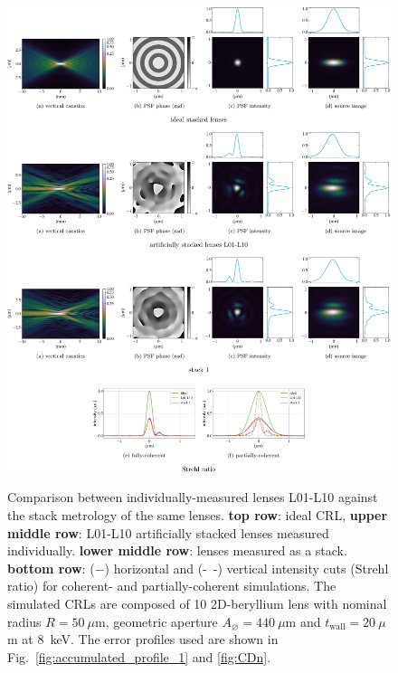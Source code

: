 \begin{refsection}
\begin{figure}[ht]
        \centering
        {\includegraphics[width=1\linewidth]{figures/ch05/CDn_vs_CDnStack.pdf}}
        \caption[Artificially stacked lenses L01-L11 vs. stack 1 comparison]{Comparison between individually-measured lenses L01-L10 against the stack metrology of the same lenses. \textbf{top row}: ideal CRL, \textbf{upper middle row}: L01-L10 artificially stacked lenses measured individually. \textbf{lower middle row}: lenses measured as a stack. \textbf{bottom row}: ($-$) horizontal and (-~-) vertical intensity cuts (Strehl ratio) for coherent- and partially-coherent simulations. The simulated CRLs are composed of 10 2D-beryllium lens with nominal radius $R=50~\mu\text{m}$, geometric aperture $A_{\diameter}=440~\mu\text{m}$ and $t_\text{wall}=20~\mu$m at 8~keV. The error profiles used are shown in Fig.~\ref{fig:accumulated_profile_1} and \ref{fig:CDn}.}\label{fig:CDn_vs_CDnStack}
\end{figure}


\end{refsection}
